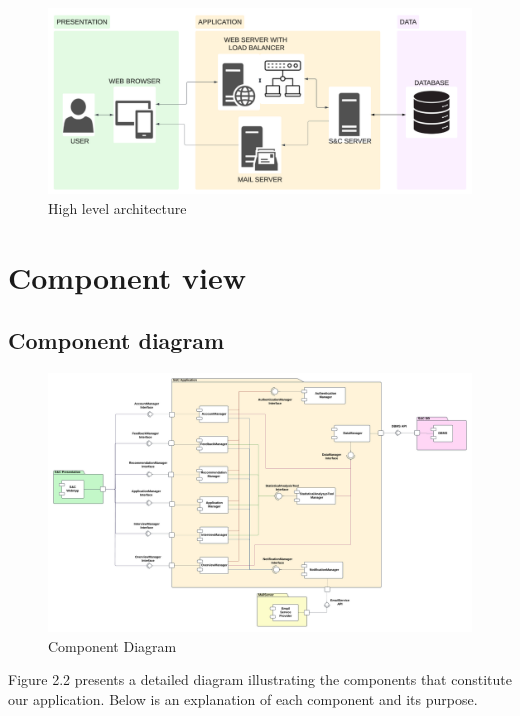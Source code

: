 \begin{figure}[H]
    \centering
    \includegraphics[width=0.8\linewidth]{DD//Images/3tier.png}
    \caption{High level architecture }
\end{figure}

\section{Component view} 

\subsection{Component diagram}

\begin{figure}[H]
    \centering
    \includegraphics[width=1\linewidth]{DD//Images/ComponentDiagram.png}
    \caption{Component Diagram }
\end{figure}

Figure 2.2 presents a detailed diagram illustrating the components that constitute our application. Below is an explanation of each component and its purpose.

